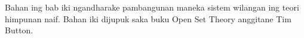 \documentclass[../../../include/open-logic-chapter]{subfiles}
\begin{document}

\begin{editorial}
Bahan ing bab iki ngandharake pambangunan maneka sistem wilangan
ing teori himpunan naif. Bahan iki dijupuk saka buku Open Set Theory
anggitane Tim Button.
\end{editorial}


\OLEndChapterHook
\end{document}
